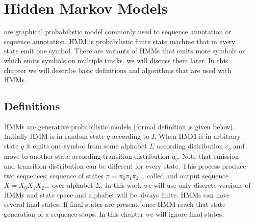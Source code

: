 \chapter{Hidden Markov Models}

 are graphical probabilistic model
commonly used to sequence annotation or sequence annotation. HMM is
probabilistic finite state machine that in every state emit one symbol. There
are variants of HMMs that emits more symbols or which emits symbols on multiple
tracks, we will discuss them later. In this chapter we will describe basic
definitions and algorithms that are used with HMMs.

\section{Definitions}\label{SECTION:HMMDEF}
                       
HMMs are generative probabilistic models (formal definition is given below). Initially HMM is in random state $q$
according to  $I$.  When HMM is in arbitrary
state $q$ it emits one symbol from some alphabet $\Sigma$ according distribution
$e_q$ and move to another state according transition distribution $a_q$. Note
that emission and transition distribution can be different for every state.
This process produce two sequences: sequence of states
$\pi=\pi_0\pi_1\pi_2\dots$ called  and output sequence
$X=X_0X_1X_2\dots$ over alphabet $\Sigma$. In this work we will use only
discrete versions of HMMs and state space and alphabet will be always finite.
HMMs can have several final states. If final states are present, once HMM reach
that state generation of a sequence stops. In this chapter we will ignore final
states. 

